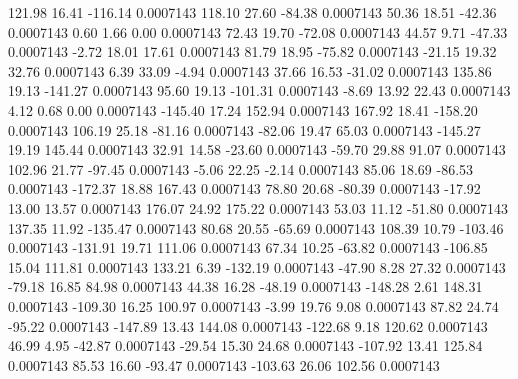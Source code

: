       121.98       16.41     -116.14     0.0007143
      118.10       27.60      -84.38     0.0007143
       50.36       18.51      -42.36     0.0007143
        0.60        1.66        0.00     0.0007143
       72.43       19.70      -72.08     0.0007143
       44.57        9.71      -47.33     0.0007143
       -2.72       18.01       17.61     0.0007143
       81.79       18.95      -75.82     0.0007143
      -21.15       19.32       32.76     0.0007143
        6.39       33.09       -4.94     0.0007143
       37.66       16.53      -31.02     0.0007143
      135.86       19.13     -141.27     0.0007143
       95.60       19.13     -101.31     0.0007143
       -8.69       13.92       22.43     0.0007143
        4.12        0.68        0.00     0.0007143
     -145.40       17.24      152.94     0.0007143
      167.92       18.41     -158.20     0.0007143
      106.19       25.18      -81.16     0.0007143
      -82.06       19.47       65.03     0.0007143
     -145.27       19.19      145.44     0.0007143
       32.91       14.58      -23.60     0.0007143
      -59.70       29.88       91.07     0.0007143
      102.96       21.77      -97.45     0.0007143
       -5.06       22.25       -2.14     0.0007143
       85.06       18.69      -86.53     0.0007143
     -172.37       18.88      167.43     0.0007143
       78.80       20.68      -80.39     0.0007143
      -17.92       13.00       13.57     0.0007143
      176.07       24.92      175.22     0.0007143
       53.03       11.12      -51.80     0.0007143
      137.35       11.92     -135.47     0.0007143
       80.68       20.55      -65.69     0.0007143
      108.39       10.79     -103.46     0.0007143
     -131.91       19.71      111.06     0.0007143
       67.34       10.25      -63.82     0.0007143
     -106.85       15.04      111.81     0.0007143
      133.21        6.39     -132.19     0.0007143
      -47.90        8.28       27.32     0.0007143
      -79.18       16.85       84.98     0.0007143
       44.38       16.28      -48.19     0.0007143
     -148.28        2.61      148.31     0.0007143
     -109.30       16.25      100.97     0.0007143
       -3.99       19.76        9.08     0.0007143
       87.82       24.74      -95.22     0.0007143
     -147.89       13.43      144.08     0.0007143
     -122.68        9.18      120.62     0.0007143
       46.99        4.95      -42.87     0.0007143
      -29.54       15.30       24.68     0.0007143
     -107.92       13.41      125.84     0.0007143
       85.53       16.60      -93.47     0.0007143
     -103.63       26.06      102.56     0.0007143
